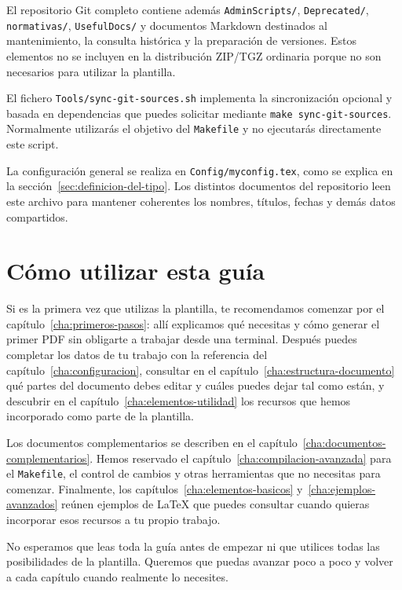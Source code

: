 El repositorio Git completo contiene además \texttt{AdminScripts/}, \texttt{Deprecated/}, \texttt{normativas/}, \texttt{UsefulDocs/} y documentos Markdown destinados al mantenimiento, la consulta histórica y la preparación de versiones. Estos elementos no se incluyen en la distribución ZIP/TGZ ordinaria porque no son necesarios para utilizar la plantilla.

El fichero \texttt{Tools/sync-git-sources.sh} implementa la sincronización opcional y basada en dependencias que puedes solicitar mediante \texttt{make sync-git-sources}. Normalmente utilizarás el objetivo del \texttt{Makefile} y no ejecutarás directamente este script.

La configuración general se realiza en \texttt{Config/myconfig.tex}, como se explica en la sección~\ref{sec:definicion-del-tipo}. Los distintos documentos del repositorio leen este archivo para mantener coherentes los nombres, títulos, fechas y demás datos compartidos.



\section{Cómo utilizar esta guía}
\label{sec:itinerario-guia}

Si es la primera vez que utilizas la plantilla, te recomendamos comenzar por el capítulo~\ref{cha:primeros-pasos}: allí explicamos qué necesitas y cómo generar el primer PDF sin obligarte a trabajar desde una terminal. Después puedes completar los datos de tu trabajo con la referencia del capítulo~\ref{cha:configuracion}, consultar en el capítulo~\ref{cha:estructura-documento} qué partes del documento debes editar y cuáles puedes dejar tal como están, y descubrir en el capítulo~\ref{cha:elementos-utilidad} los recursos que hemos incorporado como parte de la plantilla.

Los documentos complementarios se describen en el capítulo~\ref{cha:documentos-complementarios}. Hemos reservado el capítulo~\ref{cha:compilacion-avanzada} para el \texttt{Makefile}, el control de cambios y otras herramientas que no necesitas para comenzar. Finalmente, los capítulos~\ref{cha:elementos-basicos} y~\ref{cha:ejemplos-avanzados} reúnen ejemplos de \LaTeX{} que puedes consultar cuando quieras incorporar esos recursos a tu propio trabajo.

No esperamos que leas toda la guía antes de empezar ni que utilices todas las posibilidades de la plantilla. Queremos que puedas avanzar poco a poco y volver a cada capítulo cuando realmente lo necesites.

